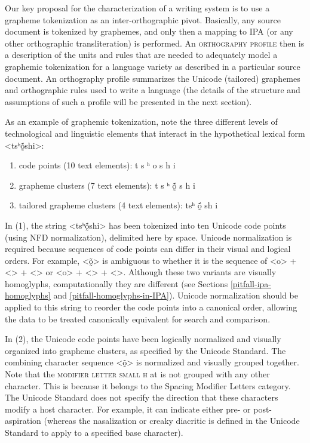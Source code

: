 Our key proposal for the characterization of a writing system is to use a
grapheme tokenization as an inter-orthographic pivot. Basically, any source
document is tokenized by graphemes, and only then a mapping to IPA (or any other
orthographic transliteration) is performed. An \textsc{orthography profile} then is a
description of the units and rules that are needed to adequately model a
graphemic tokenization for a language variety as described in a particular
source document. An orthography profile summarizes the Unicode (tailored)
graphemes and orthographic rules used to write a language (the details of the
structure and assumptions of such a profile will be presented in the next
section).


As an example of graphemic tokenization, note the three different levels of
technological and linguistic elements that interact in the hypothetical lexical
form <tsʰṍ̰shi>:

\begin{enumerate}
	\def\labelenumi{\arabic{enumi}.} 
	\item code points (10 text elements): t s ʰ o    s h i 
	\item grapheme clusters (7 text elements): t s ʰ ṍ̰ s h i 
	\item tailored grapheme clusters (4 text elements): tsʰ ṍ̰ sh i 
\end{enumerate}

In (1), the string <tsʰṍ̰shi> has been tokenized into ten Unicode code points
(using NFD normalization), delimited here by space. Unicode normalization is
required because sequences of code points can differ in their visual and logical
orders. For example, <õ̰> is ambiguous to whether it is the sequence of <o> +
<> + <> or <o> + <> + <>. Although these two variants are visually homoglyphs,
computationally they are different (see Sections \ref{pitfall-ipa-homoglyphs} and \ref{pitfall-homoglyphs-in-IPA}). 
Unicode normalization should be applied to
this string to reorder the code points into a canonical order, allowing the data
to be treated canonically equivalent for search and comparison. 

In (2), the
Unicode code points have been logically normalized and visually organized into
grapheme clusters, as specified by the Unicode Standard. The combining character
sequence <õ̰> is normalized and visually grouped together. Note that the
\textsc{modifier letter small h} at  is not grouped with any 
other character. This is because it
belongs to the Spacing Modifier Letters category. The Unicode Standard 
does not specify the direction that these characters modify a host
character. For example, it can indicate either pre- or post-aspiration (whereas the
nasalization or creaky diacritic is defined in the Unicode Standard to apply to
a specified base character). 

